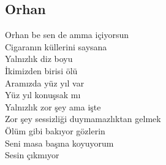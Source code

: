 \subsection{Orhan}

Orhan be sen de amma içiyorsun \\
Cigaranın küllerini saysana \\
Yalnızlık diz boyu \\
İkimizden birisi ölü \\
Aramızda yüz yıl var \\
Yüz yıl konuşsak mı \\
Yalnızlık zor şey ama işte \\
Zor şey sessizliği duymamazlıktan gelmek \\
Ölüm gibi bakıyor gözlerin \\
Seni masa başına koyuyorum \\
Sesin çıkmıyor \\